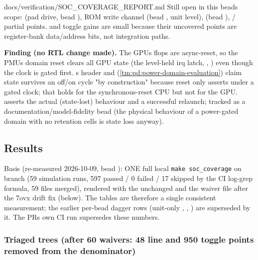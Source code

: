 \begin{relocated}{docs/verification/SOC_COVERAGE_REPORT.md}
Still open in this bead\textquotesingle s scope:  (pad
drive, bead ), ROM write channel 
(bead , unit level),  (bead ),
/ partial points.
 and  toggle gains are small
because their uncovered points are register-bank
data/\allowbreak{}address bits, not integration paths.

\textbf{Finding (no RTL change made).} The GPU\textquotesingle s flops
are async-reset, so the PMU\textquotesingle s domain reset clears all
GPU state (the level-held irq latch, , )
even though the clock is gated first. \textquotesingle s
header and  (\cref{tm:pd:power-domain-evaluation}) claim state survives an
off/on cycle "by construction" because reset only asserts under a gated
clock; that holds for the synchronous-reset CPU but not for the GPU.
 asserts the actual (state-lost)
behaviour and a successful relaunch; tracked as a
documentation/\allowbreak{}model-fidelity bead (the physical behaviour
of a power-gated domain with no retention cells is state loss anyway).

\subsection{Results}\label{tm:flow:soc-coverage-report:results}

Basis (re-measured 2026-10-09, bead ): ONE full local
\texttt{make\ soc\_\allowbreak{}coverage} on branch
 (59 simulation runs, 597 passed / 0
failed / 17 skipped by the CI log-grep formula, 59  files
merged), rendered with the unchanged
 and the waiver file after the 7ovx
drift fix (below). The tables are therefore a single consistent
measurement; the earlier per-bead dagger rows (unit-only
, , ) are
superseded by it. The PR\textquotesingle s own CI 
run supersedes these numbers.

\subsubsection{Triaged trees (after 60 waivers: 48 line and 950 toggle
points removed from the denominator)}\label{tm:flow:soc-coverage-report:triaged-trees-after-60-waivers-48-line-and-950-toggle-points-removed-from-the-denominator}


\end{relocated}
